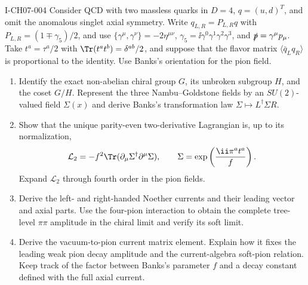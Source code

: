 \begin{exercise}{I-CH07-004}
Consider QCD with two massless quarks in $D=4$,
$q=(u,d)^T$, and omit the anomalous singlet axial symmetry.  Write
$q_{L,R}=P_{L,R}q$ with $P_{L,R}=(1\mp\gamma_5)/2$, and use
$\{\gamma^\mu,\gamma^\nu\}=-2\eta^{\mu\nu}$,
$\gamma_5=\ii\gamma^0\gamma^1\gamma^2\gamma^3$, and
$\slashed p=\gamma^\mu p_\mu$.  Take $t^a=\tau^a/2$ with
$\Tr(t^at^b)=\delta^{ab}/2$, and suppose that the flavor matrix
$\langle\bar q_Lq_R\rangle$ is proportional to the identity.  Use Banks's
orientation for the pion field.

\begin{enumerate}[label=(\alph*)]
\item Identify the exact non-abelian chiral group $G$, its unbroken subgroup
$H$, and the coset $G/H$.  Represent the three Nambu--Goldstone fields by an
$SU(2)$-valued field $\Sigma(x)$ and derive Banks's transformation law
$\Sigma\mapsto L^\dagger\Sigma R$.

\item Show that the unique parity-even two-derivative Lagrangian is, up to its
normalization,
\[
 \mathcal L_2=-f^2\Tr(\partial_\mu\Sigma^\dagger
 \partial^\mu\Sigma),
 \qquad
 \Sigma=\exp\left(\frac{\ii\pi^at^a}{f}\right).
\]
Expand $\mathcal L_2$ through fourth order in the pion fields.

\item Derive the left- and right-handed Noether currents and their leading
vector and axial parts.  Use the four-pion interaction to obtain the complete
tree-level $\pi\pi$ amplitude in the chiral limit and verify its soft limit.

\item Derive the vacuum-to-pion current matrix element.  Explain how it fixes
the leading weak pion decay amplitude and the current-algebra soft-pion
relation.  Keep track of the factor between Banks's parameter $f$ and a decay
constant defined with the full axial current.
\end{enumerate}
\end{exercise}
